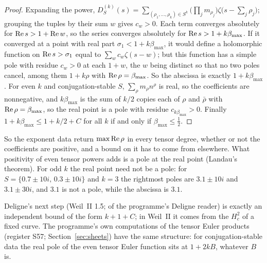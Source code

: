 \begin{proof}
Expanding the power, $D_S^{(k)}(s)=\sum_{(\rho_1,\dots,\rho_{k})\in S^{k}}\big(\prod_jm_{\rho_j}\big)\zeta\big(s-\sum_j\rho_j\big)$; grouping the tuples by their sum $w$ gives $c_w>0$. Each term converges absolutely for $\operatorname{Re} s>1+\operatorname{Re} w$, so the series converges absolutely for $\operatorname{Re} s>1+k\beta_{\max}$.
If it converged at a point with real part $\sigma_1<1+k\beta_{\max}$, it would define a holomorphic function on $\operatorname{Re} s>\sigma_1$ equal to $\sum_wc_w\zeta(s-w)$; but this function has a simple pole with residue $c_w>0$ at each $1+w$, the $w$ being distinct so that no two poles cancel, among them $1+k\rho$ with $\operatorname{Re}\rho=\beta_{\max}$. So the abscissa is exactly $1+k\beta_{\max}$.
For even $k$ and conjugation-stable $S$, $\sum_\rho m_\rho n^\rho$ is real, so the coefficients are nonnegative, and $k\beta_{\max}$ is the sum of $k/2$ copies each of $\rho$ and $\bar\rho$ with $\operatorname{Re}\rho=\beta_{\max}$, so the real point is a pole with residue $c_{k\beta_{\max}}>0$.
Finally $1+k\beta_{\max}\le1+k/2+C$ for all $k$ if and only if $\beta_{\max}\le\tfrac12$.
\end{proof}

So the exponent data return $\max\operatorname{Re}\rho$ in every tensor degree, whether or not the coefficients are positive, and a bound on it has to come from elsewhere. What positivity of even tensor powers adds is a pole at the real point (Landau's theorem). For odd $k$ the real point need not be a pole: for $S=\{0.7\pm10i,\,0.3\pm10i\}$ and $k=3$ the rightmost poles are $3.1\pm10i$ and $3.1\pm30i$, and $3.1$ is not a pole, while the abscissa is $3.1$.

Deligne's next step (Weil~II 1.5;  of the programme's Deligne reader) is exactly an independent bound of the form $k+1+C$; in Weil~II it comes from the $H^2_c$ of a fixed curve. The programme's own computations of the tensor Euler products (register S57; Section~\ref{sec:sheets}) have the same structure: for conjugation-stable data the real pole of the even tensor Euler function sits at $1+2kB$, whatever $B$ is.

